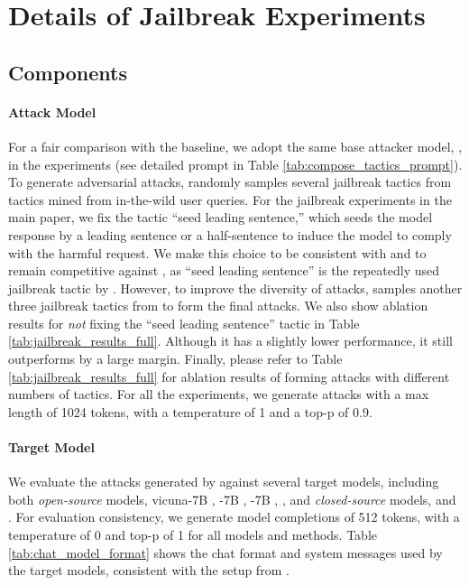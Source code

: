 \section{Details of \method Jailbreak Experiments}

\subsection{\method Components}
\label{assec:wildteaming_components}

\paragraph{Attack Model}

For a fair comparison with the \pair baseline, we adopt the same base attacker model, \mixtral, in the \method experiments (see detailed prompt in Table \ref{tab:compose_tactics_prompt}). To generate adversarial attacks, \method randomly samples several jailbreak tactics from tactics mined from in-the-wild user queries. For the jailbreak experiments in the main paper, we fix the tactic ``seed leading sentence,'' which seeds the model response by a leading sentence or a half-sentence to induce the model to comply with the harmful request. We make this choice to be consistent with and to remain competitive against \pair, as ``seed leading sentence'' is the repeatedly used jailbreak tactic by \pair. However, to improve the diversity of attacks, \method samples another three jailbreak tactics from \tacticbank to form the final attacks. We also show ablation results for \textit{not} fixing the ``seed leading sentence'' tactic in Table \ref{tab:jailbreak_results_full}. Although it has a slightly lower performance, it still outperforms \pair by a large margin. Finally, please refer to Table \ref{tab:jailbreak_results_full} for ablation results of forming attacks with different numbers of tactics. For all the experiments, we generate attacks with a max length of 1024 tokens, with a temperature of 1 and a top-p of 0.9.







\paragraph{Target Model}
We evaluate the attacks generated by \method against several target models, including both \textit{open-source} models, \ie vicuna-7B \citep{vicuna2023}, \tulu-7B \citep{ivison2023tulu}, \mistral-7B \citep{jiang2023mistral}, \mixtral \citep{jiang2024mixtral}, and \textit{closed-source} models, \ie \chatgpt and \gptfour \citep{openai2024gpt4}. For evaluation consistency, we generate model completions of 512 tokens, with a temperature of 0 and top-p of 1 for all models and methods. Table \ref{tab:chat_model_format} shows the chat format and system messages used by the target models, consistent with the setup from \harmbench.


